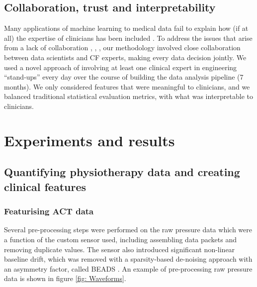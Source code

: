\documentclass{article}
\begin{document}
\subsection{Collaboration, trust and interpretability}

Many applications of machine learning to medical data fail to explain how (if at all) the expertise of clinicians has been included \cite{Alaa2018}. To address the issues that arise from a lack of collaboration \cite{Vayena2018}, \cite{Challen231}, \cite{Char2018}, \cite{Ahmad2018} our methodology involved close collaboration between data scientists and CF experts, making every data decision jointly. We used a novel approach of involving at least one clinical expert in engineering “stand-ups” every day over the course of building the data analysis pipeline (7 months). We only considered features that were meaningful to clinicians, and we balanced traditional statistical evaluation metrics, with what was interpretable to clinicians.  

\section{Experiments and results}

\subsection{Quantifying physiotherapy data and creating clinical features}

\subsubsection{Featurising ACT data}

Several pre-processing steps were performed on the raw pressure data which were a function of the custom sensor used, including assembling data packets and removing duplicate values. The sensor also introduced significant non-linear baseline drift, which was removed with a sparsity-based de-noising approach with an asymmetry factor, called BEADS \cite{Ning2014}. An example of pre-processing raw pressure data is shown in figure \ref{fig: Waveforms}.
\end{document}
